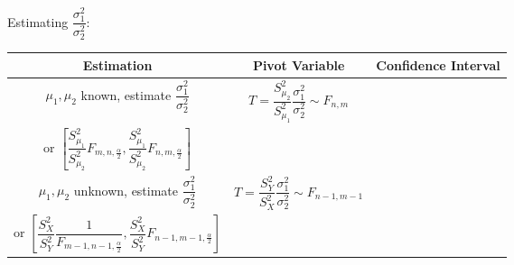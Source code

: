 \documentclass[11pt,a4paper]{ctexart}
\numberwithin{equation}{section}%
\begin{document}
\begin{enumerate}
    Estimating $\dfrac{\sigma^2_1}{\sigma_2^2}$:
    \begin{table}[htbp]
        \centering
        \renewcommand\arraystretch{2.2}
        \begin{tabular}{|c|c|c|}
            \hline
            Estimation& Pivot Variable & Confidence Interval\\
            \hline
            $\mu_1,\mu_2$ known, estimate $\dfrac{\sigma^2_1}{\sigma_2^2}$&$T=\dfrac{S_{\mu_2}^2}{S_{\mu_1}^2}\dfrac{\sigma_1^2}{\sigma^2_2}\sim F_{n,m}$&\makecell{$\left[\dfrac{S_{\mu_1}^2}{S_{\mu_2}^2}\dfrac{1}{F_{m,n,\frac{\alpha}{2}}},\dfrac{S_{\mu_1}^2}{S_{\mu_2}^2}\dfrac{1}{F_{m,n,1-\frac{\alpha}{2}}}\right]$\\or $\left[\dfrac{S_{\mu_1}^2}{S_{\mu_2}^2}{F_{m,n,\frac{\alpha}{2}}},\dfrac{S_{\mu_1}^2}{S_{\mu_2}^2}F_{n,m,\frac{\alpha}{2}}\right]$}\\
            \hline
            $\mu_1,\mu_2$ unknown, estimate $\dfrac{\sigma^2_1}{\sigma_2^2}$&$T=\dfrac{S_Y^2}{S_X^2}\dfrac{\sigma_1^2}{\sigma^2_2}\sim F_{n-1,m-1}$&\makecell{$\left[\dfrac{S_X^2}{S_Y^2}\dfrac{1}{F_{m-1,n-1,\frac{\alpha}{2}}},\dfrac{S_X^2}{S_Y^2}\dfrac{1}{F_{m-1,n-1,1-\frac{\alpha}{2}}}\right]$\\or $\left[\dfrac{S_X^2}{S_Y^2}\dfrac{1}{F_{m-1,n-1,\frac{\alpha}{2}}},\dfrac{S_X^2}{S_Y^2}F_{n-1,m-1,\frac{\alpha}{2}}\right]$}\\
            \hline
        \end{tabular}
    \end{table}
    

\end{enumerate}
\end{document}
